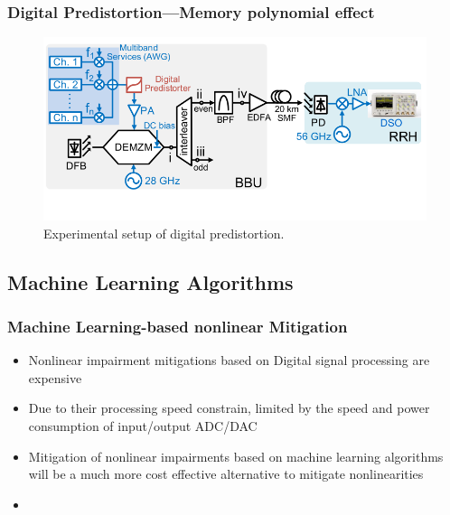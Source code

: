 \documentclass[t]{beamer}
\begin{document}
\begin{frame}
    \frametitle{Digital Predistortion---Memory polynomial effect}
    \begin{figure}
        \includegraphics[width=\textwidth]{digitalPredistortionExperiment.PNG}
        \caption{Experimental setup of digital predistortion.}
    \end{figure}
\end{frame}


\subsection{Machine Learning Algorithms}
\begin{frame}
    \frametitle{Machine Learning-based nonlinear Mitigation}
    \begin{itemize}
        \item Nonlinear impairment mitigations based on Digital signal processing are expensive
        \item Due to their processing speed constrain, limited by the speed and power consumption of input/output ADC/DAC
        \item Mitigation of nonlinear impairments based on machine learning algorithms will be a much more cost effective alternative to mitigate nonlinearities
        \item 
    \end{itemize}
\end{frame}
\end{document}
